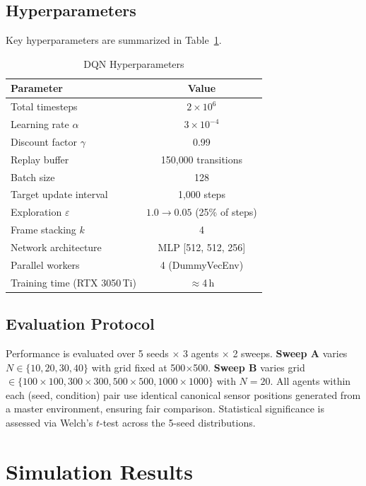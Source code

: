\documentclass[conference]{IEEEtran}
\begin{document}
\subsection{Hyperparameters}

Key hyperparameters are summarized in Table~\ref{tab:hyper}.

\begin{table}[htbp]
\caption{DQN Hyperparameters}
\begin{center}
\begin{tabular}{|l|c|}
\hline
\textbf{Parameter} & \textbf{Value} \\
\hline
Total timesteps & $2 \times 10^6$ \\
Learning rate $\alpha$ & $3 \times 10^{-4}$ \\
Discount factor $\gamma$ & 0.99 \\
Replay buffer & 150{,}000 transitions \\
Batch size & 128 \\
Target update interval & 1{,}000 steps \\
Exploration $\varepsilon$ & $1.0 \to 0.05$ (25\% of steps) \\
Frame stacking $k$ & 4 \\
Network architecture & MLP [512, 512, 256] \\
Parallel workers & 4 (DummyVecEnv) \\
Training time (RTX 3050\,Ti) & $\approx$4\,h \\
\hline
\end{tabular}
\label{tab:hyper}
\end{center}
\end{table}

\subsection{Evaluation Protocol}

Performance is evaluated over 5 seeds $\times$ 3 agents $\times$ 2 sweeps. \textbf{Sweep A} varies $N \in \{10, 20, 30, 40\}$ with grid fixed at 500$\times$500. \textbf{Sweep B} varies grid $\in \{100{\times}100, 300{\times}300, 500{\times}500, 1000{\times}1000\}$ with $N = 20$. All agents within each (seed, condition) pair use identical canonical sensor positions generated from a master environment, ensuring fair comparison. Statistical significance is assessed via Welch's $t$-test across the 5-seed distributions.

\section{Simulation Results}
\end{document}
